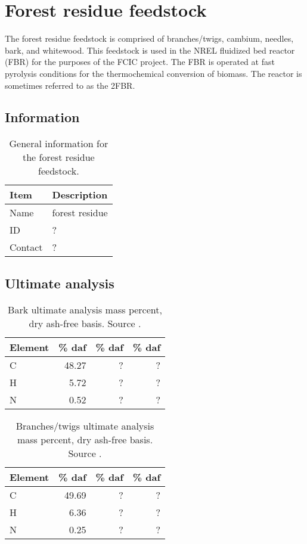 
\section{Forest residue feedstock}

The forest residue feedstock is comprised of branches/twigs, cambium, needles, bark, and whitewood. This feedstock is used in the NREL fluidized bed reactor (FBR) for the purposes of the FCIC project. The FBR is operated at fast pyrolysis conditions for the thermochemical conversion of biomass. The reactor is sometimes referred to as the 2FBR.

\subsection{Information}

\begin{table}[H]
    \centering
    \caption{General information for the forest residue feedstock.}
    \begin{tabular}{ll}
        \toprule
        Item    & Description \\
        \midrule
        Name    & forest residue \\
        ID      & ? \\
        Contact & ? \\
        \bottomrule
    \end{tabular}
\end{table}

\subsection{Ultimate analysis}

\begin{table}[H]
    \centering
    \caption{Bark ultimate analysis mass percent, dry ash-free basis. Source \cite{Unknown-2019}.}
    \begin{tabular}{lrrr}
        \toprule
        Element & \% daf & \% daf & \% daf \\
        \midrule
        C        & 48.27 & ? & ? \\
        H        & 5.72  & ? & ? \\
        N        & 0.52  & ? & ? \\
        \bottomrule
    \end{tabular}
\end{table}

\begin{table}[H]
    \centering
    \caption{Branches/twigs ultimate analysis mass percent, dry ash-free basis. Source \cite{Unknown-2019}.}
    \begin{tabular}{lrrr}
        \toprule
        Element & \% daf & \% daf & \% daf \\
        \midrule
        C        & 49.69 & ? & ? \\
        H        & 6.36  & ? & ? \\
        N        & 0.25  & ? & ? \\
        \bottomrule
    \end{tabular}
\end{table}

